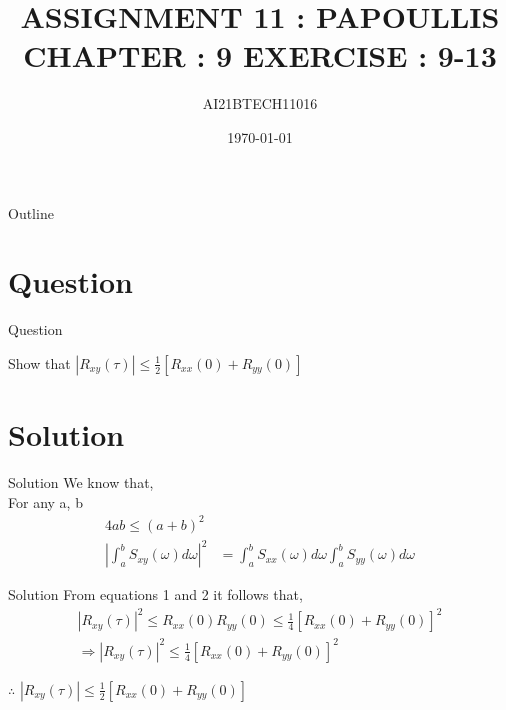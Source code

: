 \documentclass{beamer}
\title{ASSIGNMENT 11 : PAPOULLIS CHAPTER : 9 EXERCISE : 9-13}
\author{AI21BTECH11016}
\date{\today}
\providecommand{\abs}[1]{\left\vert#1\right\vert}
\providecommand{\sbrak}[1]{\ensuremath{{}\left[#1\right]}}
\begin{document}
\begin{frame}
    \titlepage 
\end{frame}

\logo{}

\begin{frame}{Outline}
    \tableofcontents
\end{frame}

\section{Question}
\begin{frame}{Question}
\begin{block}{}
\centering
Show that $\abs{{R_{xy}(\tau)}} \leq \frac{1}{2} \sbrak{R_{xx}(0) + R_{yy}(0)}$
\end{block}
\end{frame}

\section{Solution}
\begin{frame}{Solution}
We know that,\\
  For any a, b 
\begin{align}
 4ab \leq (a+b)^2 \\
{\abs{\int_{a}^b S_{xy}(\omega) d\omega}}^2 & = \int_{a}^b S_{xx}(\omega) d\omega \int_{a}^b S_{yy}(\omega) d\omega
\end{align}
\end{frame}

\begin{frame}{Solution}
From equations 1 and 2 it follows that,
\begin{align}
\abs{R_{xy}(\tau)}^2 \leq R_{xx}(0) R_{yy}(0) \leq \frac{1}{4} {\sbrak{R_{xx}(0) + R_{yy}(0)}}^2 \\
\Rightarrow \abs{R_{xy}(\tau)}^2 \leq \frac{1}{4} {\sbrak{R_{xx}(0) + R_{yy}(0)}}^2 
\end{align}
\begin{block}{}
\centering
$\therefore$ $\abs{{R_{xy}(\tau)}} \leq \frac{1}{2} \sbrak{R_{xx}(0) + R_{yy}(0)}$
\end{block}
\end{frame}
\end{document}
